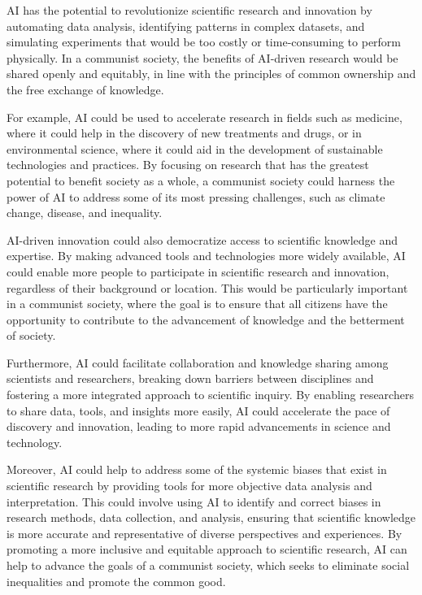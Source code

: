 AI has the potential to revolutionize scientific research and innovation by automating data analysis, identifying patterns in complex datasets, and simulating experiments that would be too costly or time-consuming to perform physically. In a communist society, the benefits of AI-driven research would be shared openly and equitably, in line with the principles of common ownership and the free exchange of knowledge.

For example, AI could be used to accelerate research in fields such as medicine, where it could help in the discovery of new treatments and drugs, or in environmental science, where it could aid in the development of sustainable technologies and practices. By focusing on research that has the greatest potential to benefit society as a whole, a communist society could harness the power of AI to address some of its most pressing challenges, such as climate change, disease, and inequality.

AI-driven innovation could also democratize access to scientific knowledge and expertise. By making advanced tools and technologies more widely available, AI could enable more people to participate in scientific research and innovation, regardless of their background or location. This would be particularly important in a communist society, where the goal is to ensure that all citizens have the opportunity to contribute to the advancement of knowledge and the betterment of society.

Furthermore, AI could facilitate collaboration and knowledge sharing among scientists and researchers, breaking down barriers between disciplines and fostering a more integrated approach to scientific inquiry. By enabling researchers to share data, tools, and insights more easily, AI could accelerate the pace of discovery and innovation, leading to more rapid advancements in science and technology.

Moreover, AI could help to address some of the systemic biases that exist in scientific research by providing tools for more objective data analysis and interpretation. This could involve using AI to identify and correct biases in research methods, data collection, and analysis, ensuring that scientific knowledge is more accurate and representative of diverse perspectives and experiences. By promoting a more inclusive and equitable approach to scientific research, AI can help to advance the goals of a communist society, which seeks to eliminate social inequalities and promote the common good.


